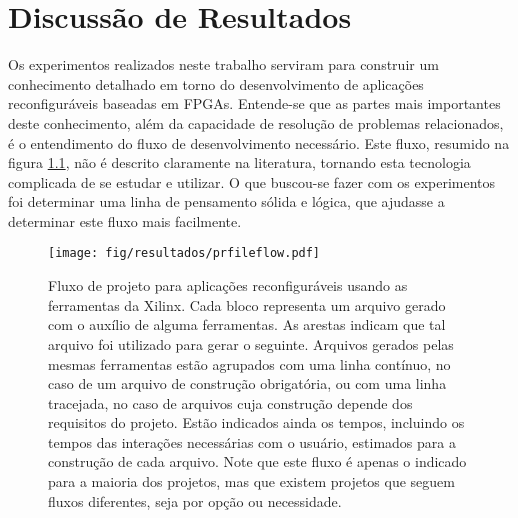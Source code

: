 \documentclass[11pt,a4paper,oneside]{book}
\begin{document}
	\frontmatter
	\tableofcontents
	\mainmatter 
	
	\newcommand\qt[1]{\lq\lq{}#1\rq\rq{}}
	\newcommand\qti[1]{\lq\lq{}\textit{#1}\rq\rq{}}
\fi
                      
\chapter{Discussão de Resultados}\label{CapExperimentos}

\vspace{0.8cm}

Os experimentos realizados neste trabalho serviram para construir um conhecimento detalhado em torno do desenvolvimento de aplicações reconfiguráveis baseadas em FPGAs.
Entende-se que as partes mais importantes deste conhecimento, além da capacidade de resolução de problemas relacionados, é o entendimento do fluxo de desenvolvimento necessário.
Este fluxo, resumido na figura \ref{fig:res:prfileflow}, não é descrito claramente na literatura, tornando esta tecnologia complicada de se estudar e utilizar.
O que buscou-se fazer com os experimentos foi determinar uma linha de pensamento sólida e lógica, que ajudasse a determinar este fluxo mais facilmente.

\begin{figure}[htp]
\centering
\texttt{[image: fig/resultados/prfileflow.pdf]}
\caption{Fluxo de projeto para aplicações reconfiguráveis usando as ferramentas da Xilinx. Cada bloco representa um arquivo gerado com o auxílio de alguma ferramentas. As arestas indicam que tal arquivo foi utilizado para gerar o seguinte. Arquivos gerados pelas mesmas ferramentas estão agrupados com uma linha contínuo, no caso de um arquivo de construção obrigatória, ou com uma linha tracejada, no caso de arquivos cuja construção depende dos requisitos do projeto. Estão indicados ainda os tempos, incluindo os tempos das interações necessárias com o usuário, estimados para a construção de cada arquivo. Note que este fluxo é apenas o indicado para a maioria dos projetos, mas que existem projetos que seguem fluxos diferentes, seja por opção ou necessidade.}
\label{fig:res:prfileflow}
\end{figure}
\end{document}

